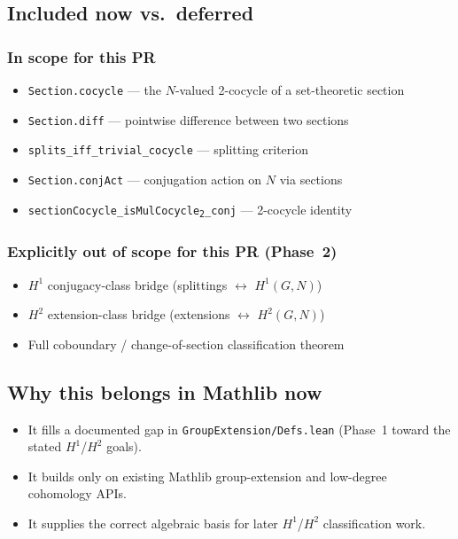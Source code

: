 \documentclass[11pt]{article}
\begin{document}
\subsection{Included now vs.\ deferred}

\subsubsection*{In scope for this PR}
\begin{itemize}[nosep]
  \item \texttt{Section.cocycle} --- the $N$-valued 2-cocycle of a set-theoretic section
  \item \texttt{Section.diff} --- pointwise difference between two sections
  \item \texttt{splits\_iff\_trivial\_cocycle} --- splitting criterion
  \item \texttt{Section.conjAct} --- conjugation action on $N$ via sections
  \item \texttt{sectionCocycle\_isMulCocycle\textsubscript{2}\_conj} --- 2-cocycle identity
\end{itemize}

\subsubsection*{Explicitly out of scope for this PR (Phase~2)}
\begin{itemize}[nosep]
  \item $H^1$ conjugacy-class bridge (splittings $\leftrightarrow$ $H^1(G, N)$)
  \item $H^2$ extension-class bridge (extensions $\leftrightarrow$ $H^2(G, N)$)
  \item Full coboundary / change-of-section classification theorem
\end{itemize}

\subsection{Why this belongs in Mathlib now}

\begin{itemize}[nosep]
  \item It fills a documented gap in \texttt{GroupExtension/Defs.lean} (Phase~1 toward the
    stated $H^1$/$H^2$ goals).
  \item It builds only on existing Mathlib group-extension and low-degree cohomology APIs.
  \item It supplies the correct algebraic basis for later $H^1$/$H^2$ classification work.
\end{itemize}
\end{document}
